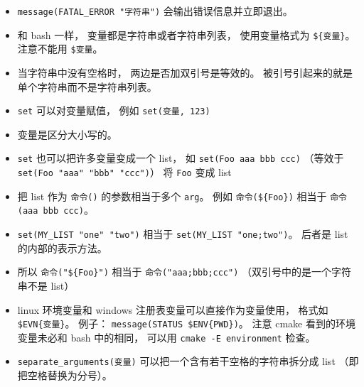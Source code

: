 \begin{itemize}
\item \verb|message(FATAL_ERROR "字符串")| 会输出错误信息并立即退出。
\item 和 bash 一样， 变量都是字符串或者字符串列表， 使用变量格式为 \verb`${变量}`。 注意不能用 \verb|$变量|。
\item 当字符串中没有空格时， 两边是否加双引号是等效的。 被引号引起来的就是单个字符串而不是字符串列表。
\item \verb`set` 可以对变量赋值， 例如 \verb`set(变量, 123)`
\item 变量是区分大小写的。
\item \verb`set` 也可以把许多变量变成一个 list， 如 \verb`set(Foo aaa bbb ccc)` （等效于 \verb|set(Foo "aaa" "bbb" "ccc")|） 将 \verb`Foo` 变成 list
\item 把 list 作为 \verb|命令()| 的参数相当于多个 \verb|arg|。 例如 \verb`命令(${Foo})` 相当于 \verb`命令(aaa bbb ccc)`。
\item \verb|set(MY_LIST "one" "two")| 相当于 \verb|set(MY_LIST "one;two")|。 后者是 list 的内部的表示方法。
\item 所以 \verb`命令("${Foo}")` 相当于 \verb`命令("aaa;bbb;ccc")` （双引号中的是一个字符串不是 list）
\item linux 环境变量和 windows 注册表变量可以直接作为变量使用， 格式如 \verb`$EVN{变量}`。 例子： \verb|message(STATUS $ENV{PWD})|。 注意 cmake 看到的环境变量未必和 bash 中的相同， 可以用 \verb`cmake -E environment` 检查。
\item \verb|separate_arguments(变量)| 可以把一个含有若干空格的字符串拆分成 list （即把空格替换为分号）。
\end{itemize}

